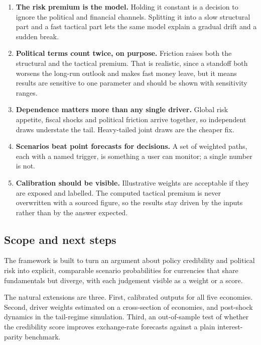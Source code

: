 \documentclass[
  british,
  a4paper,
]{article}
\providecommand{\tightlist}{%
  \setlength{\itemsep}{0pt}\setlength{\parskip}{0pt}}
\begin{document}
\begin{enumerate}
\def\labelenumi{\arabic{enumi}.}
\tightlist
\item
  \textbf{The risk premium is the model.} Holding it constant is a
  decision to ignore the political and financial channels. Splitting it
  into a slow structural part and a fast tactical part lets the same
  model explain a gradual drift and a sudden break.
\item
  \textbf{Political terms count twice, on purpose.} Friction raises both
  the structural and the tactical premium. That is realistic, since a
  standoff both worsens the long-run outlook and makes fast money leave,
  but it means results are sensitive to one parameter and should be
  shown with sensitivity ranges.
\item
  \textbf{Dependence matters more than any single driver.} Global risk
  appetite, fiscal shocks and political friction arrive together, so
  independent draws understate the tail. Heavy-tailed joint draws are
  the cheaper fix.
\item
  \textbf{Scenarios beat point forecasts for decisions.} A set of
  weighted paths, each with a named trigger, is something a user can
  monitor; a single number is not.
\item
  \textbf{Calibration should be visible.} Illustrative weights are
  acceptable if they are exposed and labelled. The computed tactical
  premium is never overwritten with a sourced figure, so the results
  stay driven by the inputs rather than by the answer expected.
\end{enumerate}

\subsection{Scope and next steps}\label{scope-and-next-steps}

The framework is built to turn an argument about policy credibility and
political risk into explicit, comparable scenario probabilities for
currencies that share fundamentals but diverge, with each judgement
visible as a weight or a score.

The natural extensions are three. First, calibrated outputs for all five
economies. Second, driver weights estimated on a cross-section of
economies, and post-shock dynamics in the tail-regime simulation. Third,
an out-of-sample test of whether the credibility score improves
exchange-rate forecasts against a plain interest-parity benchmark.
\end{document}
